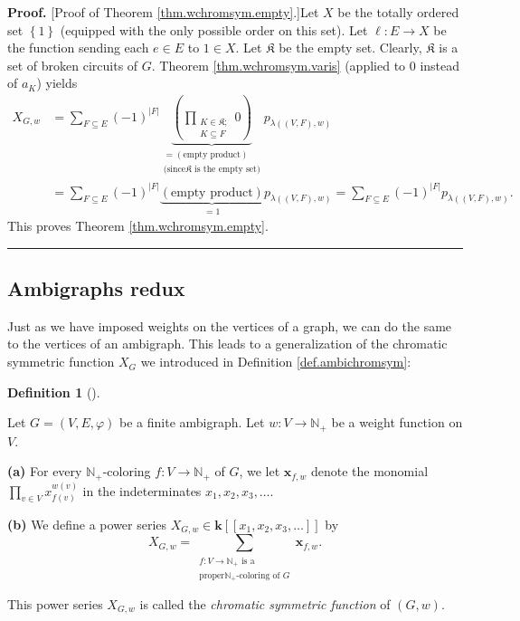 \documentclass[numbers=enddot,12pt,final,onecolumn,notitlepage]{scrartcl}%
\theoremstyle{definition}
\newtheorem{defi}[theo]{Definition}
\newenvironment{definition}[1][]
{\begin{defi}[#1]\begin{leftbar}}
{\end{leftbar}\end{defi}}
\newenvironment{proof}[1][Proof]{\noindent\textbf{#1.} }{\ \rule{0.5em}{0.5em}}
\newenvironment{verlong}{}{}
\let\sumnonlimits\sum
\let\prodnonlimits\prod
\renewcommand{\sum}{\sumnonlimits\limits}
\renewcommand{\prod}{\prodnonlimits\limits}
\begin{document}
\begin{verlong}
\begin{proof}
[Proof of Theorem \ref{thm.wchromsym.empty}.]Let $X$ be the totally ordered
set $\left\{  1\right\}  $ (equipped with the only possible order on this
set). Let $\ell:E\rightarrow X$ be the function sending each $e\in E$ to $1\in
X$. Let $\mathfrak{K}$ be the empty set. Clearly, $\mathfrak{K}$ is a set of
broken circuits of $G$. Theorem \ref{thm.wchromsym.varis} (applied to $0$
instead of $a_{K}$) yields%
\begin{align*}
X_{G,w}  &  =\sum_{F\subseteq E}\left(  -1\right)  ^{\left\vert F\right\vert
}\underbrace{\left(  \prod_{\substack{K\in\mathfrak{K};\\K\subseteq
F}}0\right)  }_{\substack{=\left(  \text{empty product}\right)  \\\text{(since
}\mathfrak{K}\text{ is the empty set)}}}p_{\lambda\left(  \left(  V,F\right)
,w\right)  }\\
&  =\sum_{F\subseteq E}\left(  -1\right)  ^{\left\vert F\right\vert
}\underbrace{\left(  \text{empty product}\right)  }_{=1}p_{\lambda\left(
\left(  V,F\right)  ,w\right)  }=\sum_{F\subseteq E}\left(  -1\right)
^{\left\vert F\right\vert }p_{\lambda\left(  \left(  V,F\right)  ,w\right)  }.
\end{align*}
This proves Theorem \ref{thm.wchromsym.empty}.
\end{proof}
\end{verlong}

\subsection{Ambigraphs redux}

Just as we have imposed weights on the vertices of a graph, we can do the same
to the vertices of an ambigraph. This leads to a generalization of the
chromatic symmetric function $X_{G}$ we introduced in Definition
\ref{def.ambichromsym}:

\begin{definition}
\label{def.wambichromsym}Let $G=\left(  V,E,\varphi\right)  $ be a finite
ambigraph. Let $w:V\rightarrow\mathbb{N}_{+}$ be a weight function on $V$.

\textbf{(a)} For every $\mathbb{N}_{+}$-coloring $f:V\rightarrow\mathbb{N}%
_{+}$ of $G$, we let $\mathbf{x}_{f,w}$ denote the monomial $\prod_{v\in
V}x_{f\left(  v\right)  }^{w\left(  v\right)  }$ in the indeterminates
$x_{1},x_{2},x_{3},\ldots$.

\textbf{(b)} We define a power series $X_{G,w}\in\mathbf{k}\left[  \left[
x_{1},x_{2},x_{3},\ldots\right]  \right]  $ by%
\[
X_{G,w}=\sum_{\substack{f:V\rightarrow\mathbb{N}_{+}\text{ is a}\\\text{proper
}\mathbb{N}_{+}\text{-coloring of }G}}\mathbf{x}_{f,w}.
\]


This power series $X_{G,w}$ is called the \emph{chromatic symmetric function}
of $\left(  G,w\right)  $.
\end{definition}
\end{document}
